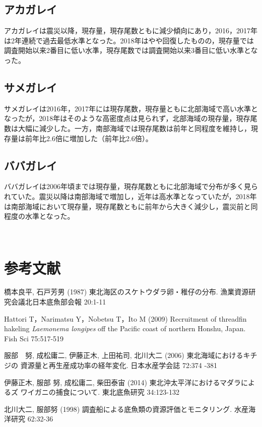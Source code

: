 \documentclass[11pt]{article} %
\begin{document}
\begin{linenumbers}
\subsection{アカガレイ}
アカガレイは震災以降，現存量，現存尾数ともに減少傾向にあり，2016，2017年は2年連続で過去最低水準となった。2018年はやや回復したものの，現存量では調査開始以来2番目に低い水準，現存尾数では調査開始以来3番目に低い水準となった。

\subsection{サメガレイ}
サメガレイは2016年，2017年には現存尾数，現存量ともに北部海域で高い水準となったが，2018年はそのような高密度点は見られず，北部海域の現存量，現存尾数は大幅に減少した。一方，南部海域では現存尾数は前年と同程度を維持し，現存量は前年比2.6倍に増加した（前年比2.6倍）。

\subsection{ババガレイ}
ババガレイは2006年頃までは現存量，現存尾数ともに北部海域で分布が多く見られていた。震災以降は南部海域で増加し，近年は高水準となっていたが，2018年は南部海域において現存量，現存尾数ともに前年から大きく減少し，震災前と同程度の水準となった。

\ \ \ \ \ \ \ \ \ \ 
\section{参考文献}
\hangindent=30pt
\noindent
橋本良平, 石戸芳男 (1987) 東北海区のスケトウダラ卵・稚仔の分布. 漁業資源研究会議北日本底魚部会報 20:1-11

\hangindent=30pt
\noindent
Hattori T，Narimatsu Y，Nobetsu T，Ito M (2009) Recruitment of threadfin hakeling \textit{Laemonema longipes} off the Pacific coast of northern Honshu, Japan. Fish Sci 75:517-519

\hangindent=30pt
\noindent
服部　努, 成松庸二, 伊藤正木, 上田祐司, 北川大二 (2006) 東北海域におけるキチジの
資源量と再生産成功率の経年変化. 日本水産学会誌 72:374 -381

\hangindent=30pt
\noindent
伊藤正木, 服部 努, 成松庸二, 柴田泰宙 (2014) 東北沖太平洋におけるマダラによるズ
ワイガニの捕食について. 東北底魚研究 34:123-132

\hangindent=30pt
\noindent
北川大二, 服部努 (1998) 調査船による底魚類の資源評価とモニタリング. 水産海洋研究 62:32-36


\end{linenumbers}
\end{document}
